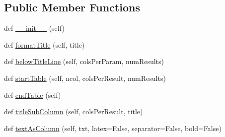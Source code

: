\subsection*{Public Member Functions}
\begin{DoxyCompactItemize}
\item 
def \mbox{\hyperlink{classplanckStyle_1_1planckStyleTableFormatter_aad10adb753214b4a998d6744e557c746}{\+\_\+\+\_\+init\+\_\+\+\_\+}} (self)
\item 
def \mbox{\hyperlink{classplanckStyle_1_1planckStyleTableFormatter_a0c7491ba27c75f0544c22edcf0b0f9c4}{format\+Title}} (self, title)
\item 
def \mbox{\hyperlink{classplanckStyle_1_1planckStyleTableFormatter_aac368526501b5610660e0af83efc4b9d}{below\+Title\+Line}} (self, cols\+Per\+Param, num\+Results)
\item 
def \mbox{\hyperlink{classplanckStyle_1_1planckStyleTableFormatter_abe8f6696463aec9d635db898a31b12d7}{start\+Table}} (self, ncol, cols\+Per\+Result, num\+Results)
\item 
def \mbox{\hyperlink{classplanckStyle_1_1planckStyleTableFormatter_a0960ddb101fe6bc34ce1051487daea3c}{end\+Table}} (self)
\item 
def \mbox{\hyperlink{classplanckStyle_1_1planckStyleTableFormatter_a5404c2d4f5b0143c48eb8922739b9769}{title\+Sub\+Column}} (self, cols\+Per\+Result, title)
\item 
def \mbox{\hyperlink{classplanckStyle_1_1planckStyleTableFormatter_a08c8e8a7d93e15be39a9b26ff6cab416}{text\+As\+Column}} (self, txt, latex=False, separator=False, bold=False)
\end{DoxyCompactItemize}
